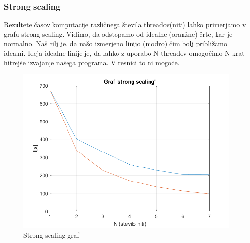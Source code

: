 \documentclass[12pt]{article}
\begin{document}
\subsubsection{Strong scaling}
Rezultete časov komputacije različnega števila threadov(niti) lahko primerjamo v grafu strong scaling. Vidimo, da odstopamo od idealne (oranžne) črte, kar je normalno. Naš cilj je, da našo izmerjeno linijo (modro) čim bolj približamo idealni. Ideja idealne linije je, da lahko z uporabo N threadov omogočimo N-krat hitrejše izvajanje našega programa. V resnici to ni mogoče.
            \begin{figure}[ht]
                \centering
                \includegraphics[width=\linewidth]{strongscaling.png}
                \renewcommand*\figurename{Slika}
                \caption{Strong scaling graf}
                \label{Slika:15}
            \end{figure}
\end{document}
